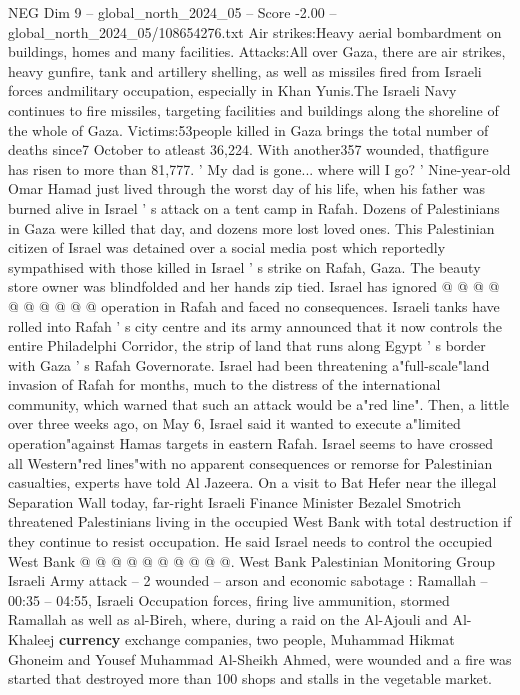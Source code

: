 \begin{textsample}{NEG Dim 9 – global\_north\_2024\_05 – Score -2.00 – global\_north\_2024\_05/108654276.txt}  \label{ex:f9_neg_162}
Air strikes:Heavy aerial bombardment on buildings, homes and many facilities.
Attacks:All over Gaza, there are air strikes, heavy gunfire, tank and artillery shelling, as well as missiles fired from Israeli forces andmilitary occupation, especially in Khan Yunis.The Israeli Navy continues to fire missiles, targeting facilities and buildings along the shoreline of the whole of Gaza.
Victims:53people killed in Gaza brings the total number of deaths since7 October to atleast 36,224.
With another357 wounded, thatfigure has risen to more than 81,777. ' My dad is gone... where will I go? ' Nine-year-old Omar Hamad just lived through the worst day of his life, when his father was burned alive in Israel ' s attack on a tent camp in Rafah.
Dozens of Palestinians in Gaza were killed that day, and dozens more lost loved ones.
This Palestinian citizen of Israel was detained over a social media post which reportedly sympathised with those killed in Israel ' s strike on Rafah, Gaza.
The beauty store owner was blindfolded and her hands zip tied.
Israel has ignored @ @ @ @ @ @ @ @ @ @ operation in Rafah and faced no consequences.
Israeli tanks have rolled into Rafah ' s city centre and its army announced that it now controls the entire Philadelphi Corridor, the strip of land that runs along Egypt ' s border with Gaza ' s Rafah Governorate.
Israel had been threatening a"full-scale"land invasion of Rafah for months, much to the distress of the international community, which warned that such an attack would be a"red line".
Then, a little over three weeks ago, on May 6, Israel said it wanted to execute a"limited operation"against Hamas targets in eastern Rafah.
Israel seems to have crossed all Western"red lines"with no apparent consequences or remorse for Palestinian casualties, experts have told Al Jazeera.
On a visit to Bat Hefer near the illegal Separation Wall today, far-right Israeli Finance Minister Bezalel Smotrich threatened Palestinians living in the occupied West Bank with total destruction if they continue to resist occupation.
He said Israel needs to control the occupied West Bank @ @ @ @ @ @ @ @ @ @.
West Bank Palestinian Monitoring Group Israeli Army attack -- 2 wounded -- arson and economic sabotage : Ramallah -- 00:35 -- 04:55, Israeli Occupation forces, firing live ammunition, stormed Ramallah as well as al-Bireh, where, during a raid on the Al-Ajouli and Al-Khaleej \textbf{currency} exchange companies, two people, Muhammad Hikmat Ghoneim and Yousef Muhammad Al-Sheikh Ahmed, were wounded and a fire was started that destroyed more than 100 shops and stalls in the vegetable market.

\end{textsample}
